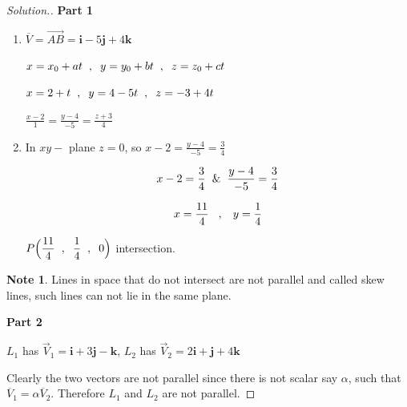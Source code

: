 \documentclass[11pt,a4paper]{article}
\theoremstyle{definition}
\newtheorem*{note}{Note}
\newenvironment{solution}
  {\renewcommand{\qedsymbol}{}\begin{proof}[\textit{Solution}.]}
  {\end{proof}}
\newcommand{\subhead}[1]{%
  \par\medskip\noindent\textbf{#1}\par\nobreak\smallskip}
\begin{document}
\begin{solution}
\subhead{Part 1}
\begin{enumerate}
\item \hspace{0.2cm}$\overline{V} = \overrightarrow{AB} = \textbf{i} - 5\textbf{j} + 4\textbf{k}$

$x = x_0 + at\hspace{0.2cm} , \hspace{0.2cm} y = y_0 + bt\hspace{0.2cm} , \hspace{0.2cm} z = z_0 + ct$

$x = 2 + t \hspace{0.2cm} , \hspace{0.2cm} y = 4 - 5t \hspace{0.2cm} , \hspace{0.2cm} z = -3 + 4t$

$\displaystyle{\frac{x - 2}{1} = \frac{y - 4}{-5} = \frac{z + 3}{4}}$

\item In $xy - $ plane $z = 0$, so\hspace{0.3cm}
$\displaystyle{x - 2 = \frac{y - 4}{-5} = \frac{3}{4}}$

$$x - 2 = \frac{3}{4}\hspace{0.2cm} \&\hspace{0.2cm} \frac{y - 4}{-5} = \frac{3}{4}$$

$$ x = \frac{11}{4} \hspace{0.3cm} , \hspace{0.3cm} y = \frac{1}{4}$$

$P\Big(\dfrac{11}{4}\hspace{0.2cm}, \hspace{0.2cm} \dfrac{1}{4}\hspace{0.2cm} , \hspace{0.2cm} 0\Big)$ intersection.
\end{enumerate}

\begin{note}
Lines in space that do not intersect are not parallel and called skew lines, such lines can not lie in the same plane.
\end{note}

\subhead{Part 2}
$L_1$ has $\overrightarrow{V}_1 = \textbf{i} + 3\textbf{j} - \textbf{k}$,
$L_2$ has $\overrightarrow{V}_2 = 2\textbf{i} + \textbf{j} + 4\textbf{k}$

Clearly the two vectors are not parallel since there is not scalar say $\alpha$, such that $\overline{V}_1 = \alpha \overline{V}_2$. Therefore $L_1$ and $L_2$ are not parallel.


\end{solution}
\end{document}

